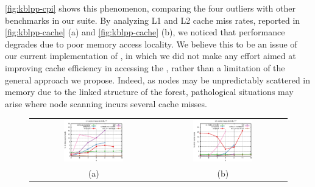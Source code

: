 \noindent \myfigure\ref{fig:kblpp-cpi} shows this phenomenon, comparing the four outliers with other benchmarks in our suite. By analyzing L1 and L2 cache miss rates, reported in \myfigure\ref{fig:kblpp-cache} (a) and \myfigure\ref{fig:kblpp-cache} (b), we noticed that performance degrades due to poor memory access locality. We believe this to be an issue of our current implementation of \kblpp, in which we did not make any effort aimed at improving cache efficiency in accessing the \ksf, rather than a limitation of the general approach we propose. Indeed, as nodes may be unpredictably scattered in memory due to the linked structure of the forest, pathological situations may arise where node scanning incurs several cache misses.

\ifdefined\noauthorea
\begin{figure}[!ht]
\begin{center}
\begin{tabular}{cc}
\hspace{-6mm}
\includegraphics[width=0.49\textwidth]{figures/kblpp-cache/kblpp-cache-L1.eps} &
\includegraphics[width=0.49\textwidth]{figures/kblpp-cache/kblpp-cache-L2.eps}\\
(a) & (b)
\end{tabular}
\caption{\protect}
\end{center}
\end{figure}
\fi


